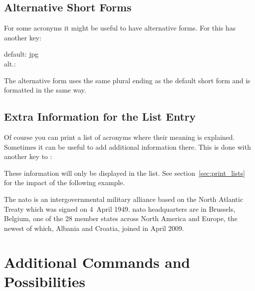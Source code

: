\documentclass[DIV10,toc=index,toc=bib,hyperfootnotes=false]{cnpkgdoc}
\begin{document}
\subsection{Alternative Short Forms}
For some acronyms it might be useful to have alternative forms. For this
 has another key:
\begin{beschreibung}
\end{beschreibung}
\begin{beispiel}
 default: \acs{jpg} \\
 alt.: 
\end{beispiel}
The alternative form uses the same plural ending as the default short form and
is formatted in the same way.

\subsection{Extra Information for the List Entry}
Of course you can print a list of acronyms where their meaning is explained.
Sometimes it can be useful to add additional information there. This is done with
another key to :
\begin{beschreibung}
\end{beschreibung}
These information will only be displayed in the list. See section~\ref{sec:print_lists}
for the impact of the following example.

\begin{beispiel}
 The \ac{nato} is an intergovernmental military alliance based on the
 North Atlantic Treaty which was signed on 4~April 1949. \ac{nato}
 headquarters are in Brussels, Belgium, one of the 28 member states
 across North America and Europe, the newest of which, Albania and
 Croatia, joined in April 2009.
\end{beispiel}

\section{Additional Commands and Possibilities}
\end{document}
